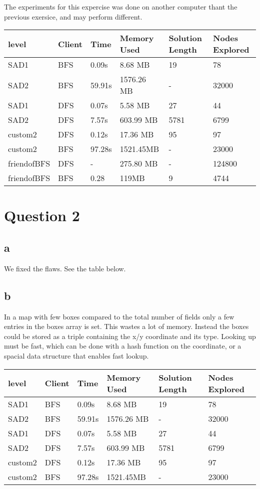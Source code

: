 \documentclass{article}
\begin{document}
The experiments for this expercise was done on another computer thant the previous exersice, and may perform
different.

\begin{tabular}{l|l|l|l|l|l}
  level & Client & Time & Memory Used & Solution Length & Nodes Explored\\\hline
  SAD1 & BFS & 0.09s & 8.68 MB & 19 & 78\\
  SAD2 & BFS & 59.91s & 1576.26 MB  & - & 32000\\
  SAD1 & DFS & 0.07s & 5.58 MB & 27 & 44\\
  SAD2 & DFS & 7.57s & 603.99 MB & 5781 & 6799\\
  custom2 & DFS & 0.12s & 17.36 MB & 95 & 97\\
  custom2 & BFS & 97.28s & 1521.45MB & - & 23000\\
  friendofBFS & DFS & - & 275.80 MB & - & 124800 \\
  friendofBFS & BFS &0.28 & 119MB & 9 & 4744 \\
\end{tabular}

\section{Question 2}
\subsection{a}
We fixed the flaws. See the table below.

\subsection{b}
In a map with few boxes compared to the total number of fields only a few entries in the boxes
array is set. This wastes a lot of memory. Instead the boxes could be stored as a triple containing
the x/y coordinate and its type. Looking up must be fast, which can be done with a hash function on
the coordinate, or a spacial data structure that enables fast lookup.\\

\begin{tabular}{l|l|l|l|l|l}
  level & Client & Time & Memory Used & Solution Length & Nodes Explored\\\hline
  SAD1 & BFS & 0.09s & 8.68 MB & 19 & 78\\
  SAD2 & BFS & 59.91s & 1576.26 MB  & - & 32000\\
  SAD1 & DFS & 0.07s & 5.58 MB & 27 & 44\\
  SAD2 & DFS & 7.57s & 603.99 MB & 5781 & 6799\\
  custom2 & DFS & 0.12s & 17.36 MB & 95 & 97\\
  custom2 & BFS & 97.28s & 1521.45MB & - & 23000\\
\end{tabular}
\end{document}
